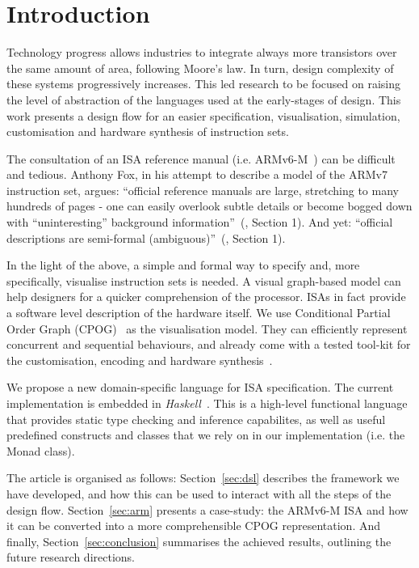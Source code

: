 \documentclass[conference]{IEEEtran}
\begin{document}
\IEEEpeerreviewmaketitle

\section{Introduction}
\label{sec:intro}
Technology progress allows industries to integrate always more transistors over the
same amount of area, following Moore's law. In turn, design complexity of these
systems progressively increases. This led research to be focused on raising the
level of abstraction of the languages used at the early-stages of design. This work
presents a design flow for an easier specification, visualisation, simulation,
customisation and hardware synthesis of instruction sets.

The consultation of an ISA reference manual (i.e. ARMv6-M~\cite{armManual}) can be
difficult and tedious. Anthony Fox, in his attempt to describe a model
of the ARMv7 instruction set, argues: ``official reference manuals are large,
stretching to many hundreds of pages - one can easily overlook subtle details or
become bogged down with ``uninteresting'' background information''~(\cite{armv7},
Section 1). And yet: ``official descriptions are semi-formal (ambiguous)''~(\cite{armv7}, Section 1). 

In the light of the above, a simple and formal way to specify and, more
specifically, visualise instruction sets is needed. A visual graph-based model can
help designers for a quicker comprehension of the processor. ISAs in fact provide a
software level description of the hardware itself. We use Conditional Partial Order
Graph (CPOG)~\cite{cpog}\cite{andreyPhd} as the visualisation model. They can
efficiently represent concurrent and sequential behaviours, and already come with a
tested tool-kit for the customisation, encoding and hardware synthesis~\cite{workcraft}\cite{satEncoding}\cite{acsd}.

We propose a new domain-specific language for ISA specification. The current
implementation is embedded in \textit{Haskell}~\cite{haskell}. This is a high-level
functional language that provides static type checking and inference capabilites,
as well as useful predefined constructs and classes that we rely on in our
implementation (i.e. the Monad class).

The article is organised as follows: Section~\ref{sec:dsl} describes the framework
we have developed, and how this can be used to interact with all the steps of the 
design flow. Section~\ref{sec:arm} presents a case-study: the ARMv6-M ISA and how it
can be converted into a more comprehensible CPOG representation. 
And finally, Section~\ref{sec:conclusion} summarises the achieved results, 
outlining the future research directions.
\end{document}
